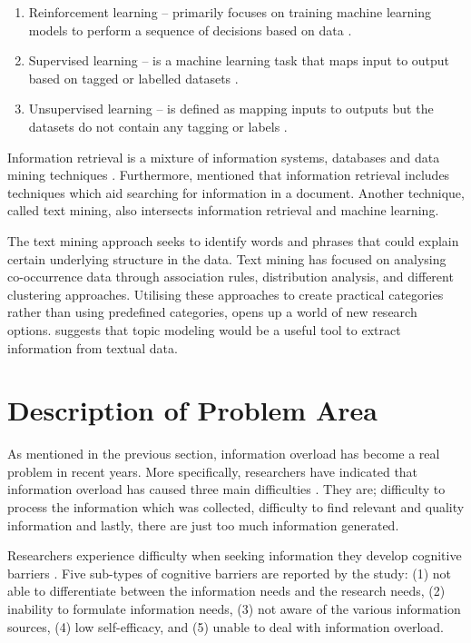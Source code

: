 \begin{enumerate}
    \item Reinforcement learning – primarily focuses on training machine learning models to perform a sequence of decisions based on data \cite{DBLP:journals/corr/abs-1806-08894}.
    \item Supervised learning – is a machine learning task that maps input to output based on tagged or labelled datasets \cite{singh2019natural}.
    \item Unsupervised learning – is defined as mapping inputs to outputs but the datasets do not contain any tagging or labels \cite{hastie2009unsupervised}.
\end{enumerate}

Information retrieval is a mixture of information systems, databases and data mining techniques \cite{baeza1999modern}. Furthermore,  mentioned that information retrieval includes techniques which aid searching for information in a document. Another technique, called text mining, also intersects information retrieval and machine learning.

The text mining approach seeks to identify words and phrases that could explain certain underlying structure in the data. Text mining has focused on analysing co-occurrence data through association rules, distribution analysis, and different clustering approaches. Utilising these approaches to create practical categories rather than using predefined categories, opens up a world of new research options.  suggests that topic modeling would be a useful tool to extract information from textual data.

\section{Description of Problem Area} \label{ssec:prob}

As mentioned in the previous section, information overload has become a real problem in recent years. More specifically, researchers have indicated that information overload has caused three main difficulties \cite{al2021exploring}. They are; difficulty to process the information which was collected, difficulty to find relevant and quality information and lastly, there are just too much information generated.

Researchers experience difficulty when seeking information they develop cognitive barriers \cite{savolainen2015cognitive}. Five sub-types of cognitive barriers are reported by the study: (1) not able to differentiate between the information needs and the research needs, (2) inability to formulate information needs, (3) not aware of the various information sources, (4) low self-efficacy, and (5) unable to deal with information overload.


